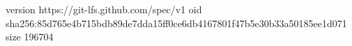 version https://git-lfs.github.com/spec/v1
oid sha256:85d765e4b715bdb89de7dda15ff0ce6db4167801f47b5e30b33a50185ee1d071
size 196704
